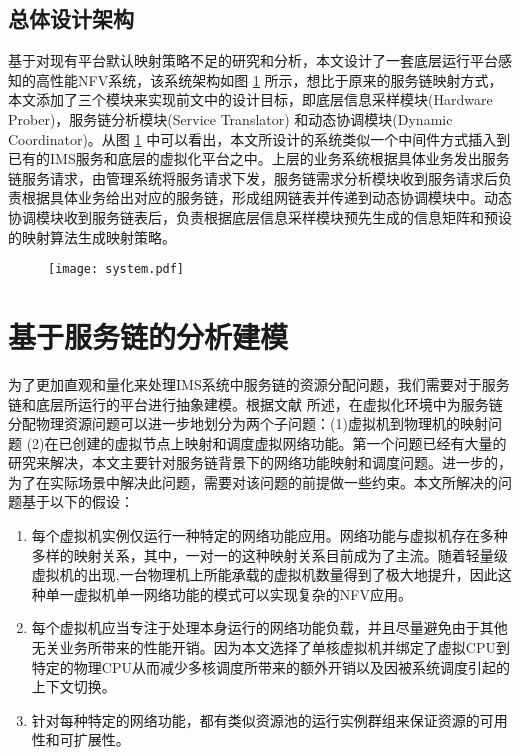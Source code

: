 \subsection{总体设计架构}
基于对现有平台默认映射策略不足的研究和分析，本文设计了一套底层运行平台感知的高性能NFV系统，该系统架构如图 \ref{fig:system} 所示，想比于原来的服务链映射方式，本文添加了三个模块来实现前文中的设计目标，即底层信息采样模块(Hardware Prober)，服务链分析模块(Service Translator) 和动态协调模块(Dynamic Coordinator)。从图 \ref{fig:system} 中可以看出，本文所设计的系统类似一个中间件方式插入到已有的IMS服务和底层的虚拟化平台之中。上层的业务系统根据具体业务发出服务链服务请求，由管理系统将服务请求下发，服务链需求分析模块收到服务请求后负责根据具体业务给出对应的服务链，形成组网链表并传递到动态协调模块中。动态协调模块收到服务链表后，负责根据底层信息采样模块预先生成的信息矩阵和预设的映射算法生成映射策略。
\begin{figure}[!htp]
	\label{fig:system}
	\centering
	\texttt{[image: system.pdf]}
\end{figure}

\section{基于服务链的分析建模}
为了更加直观和量化来处理IMS系统中服务链的资源分配问题，我们需要对于服务链和底层所运行的平台进行抽象建模。根据文献  所述，在虚拟化环境中为服务链分配物理资源问题可以进一步地划分为两个子问题：(1)虚拟机到物理机的映射问题 (2)在已创建的虚拟节点上映射和调度虚拟网络功能。第一个问题已经有大量的研究来解决，本文主要针对服务链背景下的网络功能映射和调度问题。进一步的，为了在实际场景中解决此问题，需要对该问题的前提做一些约束。本文所解决的问题基于以下的假设：
\begin{enumerate}
	\item 每个虚拟机实例仅运行一种特定的网络功能应用。网络功能与虚拟机存在多种多样的映射关系，其中，一对一的这种映射关系目前成为了主流。随着轻量级虚拟机的出现\cite{martins2014clickos,manco2017my},一台物理机上所能承载的虚拟机数量得到了极大地提升，因此这种单一虚拟机单一网络功能的模式可以实现复杂的NFV应用。
	\item 每个虚拟机应当专注于处理本身运行的网络功能负载，并且尽量避免由于其他无关业务所带来的性能开销。因为本文选择了单核虚拟机并绑定了虚拟CPU到特定的物理CPU从而减少多核调度所带来的额外开销以及因被系统调度引起的上下文切换。
	\item 针对每种特定的网络功能，都有类似资源池的运行实例群组来保证资源的可用性和可扩展性。
\end{enumerate}

